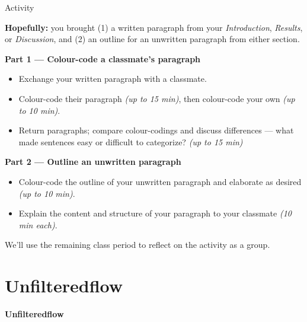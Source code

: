 \documentclass{beamer}
\begin{document}
\begin{frame}{Activity}

  \footnotesize
  \textbf{Hopefully:} you brought (1) a written paragraph from your
  \textit{Introduction}, \textit{Results}, or \textit{Discussion},
  and (2) an outline for an unwritten paragraph from either section.

  \medskip
  \textbf{Part 1 --- Colour-code a classmate's paragraph}
  \begin{itemize}
    \item Exchange your written paragraph with a classmate.
    \item Colour-code their paragraph \emph{(up to 15 min)}, then colour-code your own \emph{(up to 10 min)}.
    \item Return paragraphs; compare colour-codings and discuss differences ---
      what made sentences easy or difficult to categorize? \emph{(up to 15 min)}
  \end{itemize}

  \medskip
  \textbf{Part 2 --- Outline an unwritten paragraph}
  \begin{itemize}
    \item Colour-code the outline of your unwritten paragraph and
      elaborate as desired \emph{(up to 10 min)}.
    \item Explain the content and structure of your paragraph to your
      classmate \emph{(10 min each)}.
  \end{itemize}

  \medskip
  We'll use the remaining class period to reflect on the activity as a group.

\end{frame}





\section{Unfilteredflow}

\begin{frame}
  \centering
  \vfill
  {\Large\bfseries Unfilteredflow}
  \vfill
\end{frame}
\end{document}
